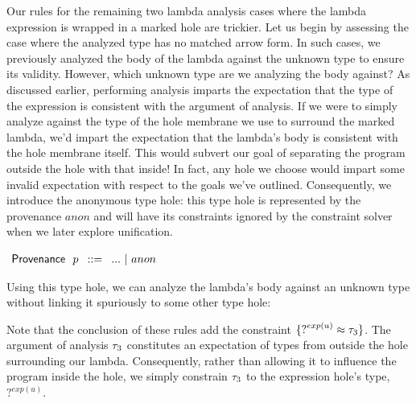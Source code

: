 Our rules for the remaining two lambda analysis cases where the lambda expression is wrapped in a marked hole are trickier. Let us begin by assessing the case where the analyzed type has no matched arrow form. In such cases, we previously analyzed the body of the lambda against the unknown type to ensure its validity. However, which unknown type are we analyzing the body against? As discussed earlier, performing analysis imparts the expectation that the type of the expression is consistent with the argument of analysis. If we were to simply analyze against the type of the hole membrane we use to surround the marked lambda, we'd impart the expectation that the lambda's body is consistent with the hole membrane itself. This would subvert our goal of separating the program outside the hole with that inside! In fact, any hole we choose would impart some invalid expectation with respect to the goals we've outlined. Consequently, we introduce the anonymous type hole: this type hole is represented by the provenance $anon$ and will have its constraints ignored by the constraint solver when we later explore unification.
\begin{center}
    $\arraycolsep=4pt\begin{array}{lll}
    \Prov~~ p & ::= & 
        ... ~\vert~ 
        anon
        \\
    \end{array}$
\end{center}
Using this type hole, we can analyze the lambda's body against an unknown type without linking it spuriously to some other type hole:
\begin{mathpar}

\end{mathpar}
Note that the conclusion of these rules add the constraint $\{ \TUnknown^{exp(u)} \approx \TMV_3 \}$. The argument of analysis $\TMV_3$ constitutes an expectation of types from outside the hole surrounding our lambda. Consequently, rather than allowing it to influence the program inside the hole, we simply constrain $\TMV_3$ to the expression hole's type, $?^{exp(u)}$.

